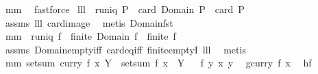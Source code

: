 \begin{isabellebody}
\isamarkupfalse%
\ mm{}{}\ \isamarkupfalse%
\ fastforce%
\endisatagproof
{\isafoldproof}%
%
\isadelimproof
%
\endisadelimproof
\isanewline
\isanewline
{}\isamarkupfalse%
\ lll{}{}{\isacharcolon}\ \ {\isachardoublequoteopen}runiq\ P{\isachardoublequoteclose}\ \ {\isachardoublequoteopen}card\ {\isacharparenleft}Domain\ P{\isacharparenright}\ {\isacharequal}\ card\ P{\isachardoublequoteclose}\ \isanewline
%
\isadelimproof
%
\endisadelimproof
%
\isatagproof
{}\isamarkupfalse%
\ assms\ lll{}{}\ card{\isacharunderscore}image\ \isamarkupfalse%
\ {\isacharparenleft}metis\ Domain{\isacharunderscore}fst{\isacharparenright}%
\endisatagproof
{\isafoldproof}%
%
\isadelimproof
\isanewline
%
\endisadelimproof
\isanewline
{}\isamarkupfalse%
\ mm{}{}{\isacharcolon}\ \ {\isachardoublequoteopen}runiq\ f{\isachardoublequoteclose}\ \ {\isachardoublequoteopen}finite\ {\isacharparenleft}Domain\ f{\isacharparenright}\ {\isacharequal}\ finite\ f{\isachardoublequoteclose}\ \isanewline
%
\isadelimproof
%
\endisadelimproof
%
\isatagproof
{}\isamarkupfalse%
\ assms\ Domain{\isacharunderscore}empty{\isacharunderscore}iff\ card{\isacharunderscore}eq{\isacharunderscore}{}{\isacharunderscore}iff\ finite{\isachardot}emptyI\ lll{}{}\ \isamarkupfalse%
\ metis%
\endisatagproof
{\isafoldproof}%
%
\isadelimproof
\isanewline
%
\endisadelimproof
\isanewline
{}\isamarkupfalse%
\ mm{}{}{\isacharcolon}\ {\isachardoublequoteopen}setsum\ {\isacharparenleft}{\isacharparenleft}curry\ f{\isacharparenright}\ x{\isacharparenright}\ Y\ {\isacharequal}\ setsum\ f\ {\isacharparenleft}{\isacharbraceleft}x{\isacharbraceright}\ {\isasymtimes}\ Y{\isacharparenright}{\isachardoublequoteclose}\isanewline
%
\isadelimproof
%
\endisadelimproof
%
\isatagproof
{}\isamarkupfalse%
\ {\isacharminus}\isanewline
{}\isamarkupfalse%
\ {\isacharquery}f{\isacharequal}{\isachardoublequoteopen}{\isacharpercent}\ y{\isachardot}\ {\isacharparenleft}x{\isacharcomma}\ y{\isacharparenright}{\isachardoublequoteclose}\ \isamarkupfalse%
\ {\isacharquery}g{\isacharequal}{\isachardoublequoteopen}{\isacharparenleft}curry\ f{\isacharparenright}\ x{\isachardoublequoteclose}\ \isamarkupfalse%
\ {\isacharquery}h{\isacharequal}f\isanewline

\end{isabellebody}
